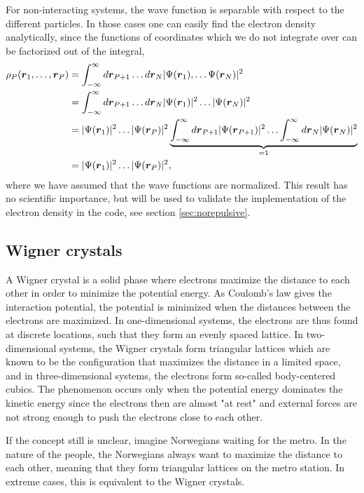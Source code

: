 For non-interacting systems, the wave function is separable with respect to the different particles. In those cases one can easily find the electron density analytically, since the functions of coordinates which we do not integrate over can be factorized out of the integral,
\begin{equation}
\begin{aligned}
\rho_P(\boldsymbol{{r}}_1,\hdots,\boldsymbol{{r}}_P)&=\int_{-\infty}^{\infty}d\boldsymbol{{r}}_{P+1}\hdots d\boldsymbol{{r}}_N |\Psi(\boldsymbol{{r}}_1),\hdots \Psi(\boldsymbol{{r}}_N)|^2\\
&=\int_{-\infty}^{\infty}d\boldsymbol{{r}}_{P+1}\hdots d\boldsymbol{{r}}_N |\Psi(\boldsymbol{{r}}_1)|^2\hdots |\Psi(\boldsymbol{{r}}_N)|^2\\
&=|\Psi(\boldsymbol{{r}}_1)|^2\hdots |\Psi(\boldsymbol{{r}}_P)|^2\underbrace{\int_{-\infty}^{\infty}d\boldsymbol{{r}}_{P+1}|\Psi(\boldsymbol{{r}}_{P+1})|^2\hdots\int_{-\infty}^{\infty}d\boldsymbol{{r}}_{N}|\Psi(\boldsymbol{{r}}_{N})|^2}_{=1}\\
&=|\Psi(\boldsymbol{{r}}_1)|^2\hdots |\Psi(\boldsymbol{{r}}_P)|^2,
\end{aligned}
\end{equation}
where we have assumed that the wave functions are normalized. This result has no scientific importance, but will be used to validate the implementation of the electron density in the code, see section \ref{sec:norepulsive}.

\subsection{Wigner crystals} \label{sec:wigner}
A Wigner crystal is a solid phase where electrons maximize the distance to each other in order to minimize the potential energy. As Coulomb's law gives the interaction potential, the potential is minimized when the distances between the electrons are maximized. In one-dimensional systems, the electrons are thus found at discrete locations, such that they form an evenly spaced lattice. In two-dimensional systems, the Wigner crystals form triangular lattices which are known to be the configuration that maximizes the distance in a limited space, and in three-dimensional systems, the electrons form so-called body-centered cubics. The phenomenon occurs only when the potential energy dominates the kinetic energy since the electrons then are almost "at rest" and external forces are not strong enough to push the electrons close to each other. 

If the concept still is unclear, imagine Norwegians waiting for the metro. In the nature of the people, the Norwegians always want to maximize the distance to each other, meaning that they form triangular lattices on the metro station. In extreme cases, this is equivalent to the Wigner crystals.


